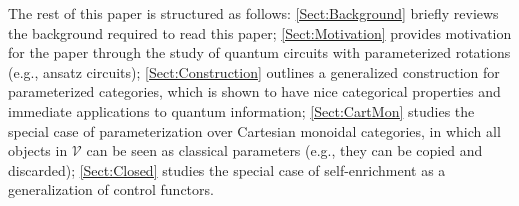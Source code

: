 The rest of this paper is structured as follows:
\cref{Sect:Background} briefly reviews the background required to read this paper;
\cref{Sect:Motivation} provides motivation for the paper through the study of quantum circuits with parameterized rotations (e.g., ansatz circuits);
\cref{Sect:Construction} outlines a generalized construction for parameterized categories, which is shown to have nice categorical properties and immediate applications to quantum information;
\cref{Sect:CartMon} studies the special case of parameterization over Cartesian monoidal categories, in which all objects in $\mathcal{V}$ can be seen as classical parameters (e.g., they can be copied and discarded);
\cref{Sect:Closed} studies the special case of self-enrichment as a generalization of control functors.
